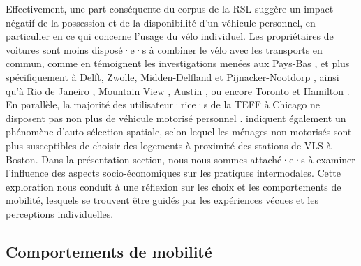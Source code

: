 \begin{refsegment}
Effectivement, une part conséquente du corpus de la \acrshort{RSL} suggère un impact négatif de la possession et de la disponibilité d'un véhicule personnel, en particulier en ce qui concerne l'usage du vélo individuel. Les propriétaires de voitures sont moins disposé·e·s à combiner le vélo avec les transports en commun, comme en témoignent les investigations menées aux Pays-Bas \textcolor{blue}{\autocite[281]{debrezion_modelling_2009}}, et plus spécifiquement à Delft, Zwolle, Midden-Delfland et Pijnacker-Nootdorp \textcolor{blue}{\autocite[115]{heinen_multimodal_2014}}, ainsi qu'à Rio de Janeiro \textcolor{blue}{\autocite[65]{souza_modelling_2017}}, Mountain View \textcolor{blue}{\autocite[657]{park_finding_2014}}, Austin \textcolor{blue}{\autocite[3~491]{li_exploring_2017}}, ou encore Toronto et Hamilton \textcolor{blue}{\autocite[2~174]{chan_factors_2020}}. En parallèle, la majorité des utilisateur·rice·s de la \acrshort{TEFF} à Chicago ne disposent pas non plus de véhicule motorisé personnel \textcolor{blue}{\autocite[11]{mohammadian_analyzing_2022}}. \textcolor{blue}{\textcite[15]{basu_planning_2021}} indiquent également un phénomène d'auto-sélection spatiale, selon lequel les ménages non motorisés sont plus susceptibles de choisir des logements à proximité des stations de \acrshort{VLS} à Boston. Dans la présentation section, nous nous sommes attaché·e·s à examiner l'influence des aspects socio-économiques sur les pratiques intermodales. Cette exploration nous conduit à une réflexion sur les choix et les comportements de mobilité, lesquels se trouvent être guidés par les expériences vécues et les perceptions individuelles.%
        
\subsection{Comportements de mobilité
    \label{chap2:comportements-mobilite}
    }


\end{refsegment}

